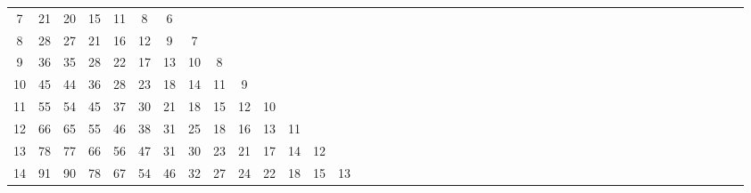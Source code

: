 \documentclass[12pt,a4paper]{amsart}
\theoremstyle{definition} %
\theoremstyle{plain} %
\begin{document}
\begin{table}[h]
{\begin{tabular}{|c|*{44}{c|}}
            7 &  21 &  20 &  15 &  11 &   8 &   6 &     &     &     &      &      &      &      &      &      &      &      &      &      &      &      &      &      &      &      &      &      &      &      &      &      &      &      &      &      &      &      &      &      &      &      &      &      &      \\
            8 &  28 &  27 &  21 &  16 &  12 &   9 &   7 &     &     &      &      &      &      &      &      &      &      &      &      &      &      &      &      &      &      &      &      &      &      &      &      &      &      &      &      &      &      &      &      &      &      &      &      &      \\
            9 &  36 &  35 &  28 &  22 &  17 &  13 &  10 &   8 &     &      &      &      &      &      &      &      &      &      &      &      &      &      &      &      &      &      &      &      &      &      &      &      &      &      &      &      &      &      &      &      &      &      &      &      \\
            10 &  45 &  44 &  36 &  28 &  23 &  18 &  14 &  11 &   9 &      &      &      &      &      &      &      &      &      &      &      &      &      &      &      &      &      &      &      &      &      &      &      &      &      &      &      &      &      &      &      &      &      &      &      \\
            11 &  55 &  54 &  45 &  37 &  30 &  21 &  18 &  15 &  12 &   10 &      &      &      &      &      &      &      &      &      &      &      &      &      &      &      &      &      &      &      &      &      &      &      &      &      &      &      &      &      &      &      &      &      &      \\
            12 &  66 &  65 &  55 &  46 &  38 &  31 &  25 &  18 &  16 &   13 &   11 &      &      &      &      &      &      &      &      &      &      &      &      &      &      &      &      &      &      &      &      &      &      &      &      &      &      &      &      &      &      &      &      &      \\
            13 &  78 &  77 &  66 &  56 &  47 &  31 &  30 &  23 &  21 &   17 &   14 &   12 &      &      &      &      &      &      &      &      &      &      &      &      &      &      &      &      &      &      &      &      &      &      &      &      &      &      &      &      &      &      &      &      \\
            14 &  91 &  90 &  78 &  67 &  54 &  46 &  32 &  27 &  24 &   22 &   18 &   15 &   13 &      &      &      &      &      &      &      &      &      &      &      &      &      &      &      &      &      &      &      &      &      &      &      &      &      &      &      &      &      &      &      \\

\end{tabular}}
\end{table}
\end{document}
